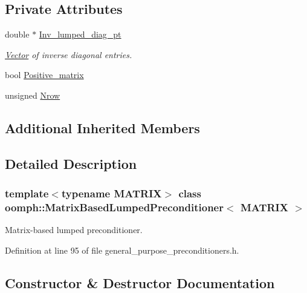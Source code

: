 \subsection*{Private Attributes}
\begin{DoxyCompactItemize}
\item 
double $\ast$ \hyperlink{classoomph_1_1MatrixBasedLumpedPreconditioner_a67bbdb462159d3198d96e7beaa37e36f}{Inv\+\_\+lumped\+\_\+diag\+\_\+pt}
\begin{DoxyCompactList}\small\item\em \hyperlink{classoomph_1_1Vector}{Vector} of inverse diagonal entries. \end{DoxyCompactList}\item 
bool \hyperlink{classoomph_1_1MatrixBasedLumpedPreconditioner_adfbe26d10029d211744f2dd6ea1508ef}{Positive\+\_\+matrix}
\item 
unsigned \hyperlink{classoomph_1_1MatrixBasedLumpedPreconditioner_a6aa1a6b695761df04e32db3563b89272}{Nrow}
\end{DoxyCompactItemize}
\subsection*{Additional Inherited Members}


\subsection{Detailed Description}
\subsubsection*{template$<$typename M\+A\+T\+R\+IX$>$\newline
class oomph\+::\+Matrix\+Based\+Lumped\+Preconditioner$<$ M\+A\+T\+R\+I\+X $>$}

Matrix-\/based lumped preconditioner. 

Definition at line 95 of file general\+\_\+purpose\+\_\+preconditioners.\+h.



\subsection{Constructor \& Destructor Documentation}
\mbox{\label{classoomph_1_1MatrixBasedLumpedPreconditioner_acb1391dde15de1c6fc82b6462d1a027f}} 

